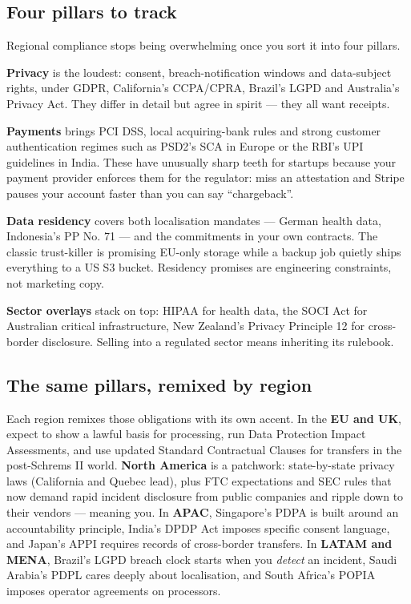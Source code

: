 \subsection{Four pillars to track}


Regional compliance stops being overwhelming once you sort it into four pillars.


\textbf{Privacy} is the loudest: consent, breach-notification windows and data-subject rights, under GDPR, California's CCPA/CPRA, Brazil's LGPD and Australia's Privacy Act. They differ in detail but agree in spirit — they all want receipts.


\textbf{Payments} brings PCI DSS, local acquiring-bank rules and strong customer authentication regimes such as PSD2's SCA in Europe or the RBI's UPI guidelines in India. These have unusually sharp teeth for startups because your payment provider enforces them for the regulator: miss an attestation and Stripe pauses your account faster than you can say ``chargeback''.


\textbf{Data residency} covers both localisation mandates — German health data, Indonesia's PP No. 71 — and the commitments in your own contracts. The classic trust-killer is promising EU-only storage while a backup job quietly ships everything to a US S3 bucket. Residency promises are engineering constraints, not marketing copy.


\textbf{Sector overlays} stack on top: HIPAA for health data, the SOCI Act for Australian critical infrastructure, New Zealand's Privacy Principle 12 for cross-border disclosure. Selling into a regulated sector means inheriting its rulebook.



\subsection{The same pillars, remixed by region}


Each region remixes those obligations with its own accent. In the \textbf{EU and UK}, expect to show a lawful basis for processing, run Data Protection Impact Assessments, and use updated Standard Contractual Clauses for transfers in the post-Schrems II world. \textbf{North America} is a patchwork: state-by-state privacy laws (California and Quebec lead), plus FTC expectations and SEC rules that now demand rapid incident disclosure from public companies and ripple down to their vendors — meaning you. In \textbf{APAC}, Singapore's PDPA is built around an accountability principle, India's DPDP Act imposes specific consent language, and Japan's APPI requires records of cross-border transfers. In \textbf{LATAM and MENA}, Brazil's LGPD breach clock starts when you \emph{detect} an incident, Saudi Arabia's PDPL cares deeply about localisation, and South Africa's POPIA imposes operator agreements on processors.


